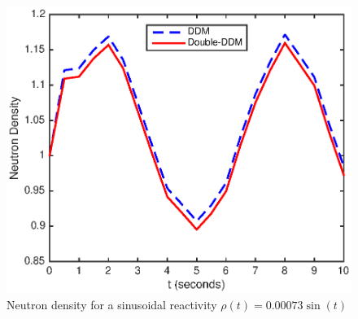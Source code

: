 \documentclass[preprint,12pt,authoryear]{elsarticle}
\begin{document}
\begin{figure}[H] 
 \centering
 \includegraphics[scale=1.0]{fig3.eps} 
 \caption{\footnotesize{Neutron density for a sinusoidal reactivity $\rho(t) = 0.00073\sin(t)$}}\label{fig3}
\end{figure}
\end{document}
